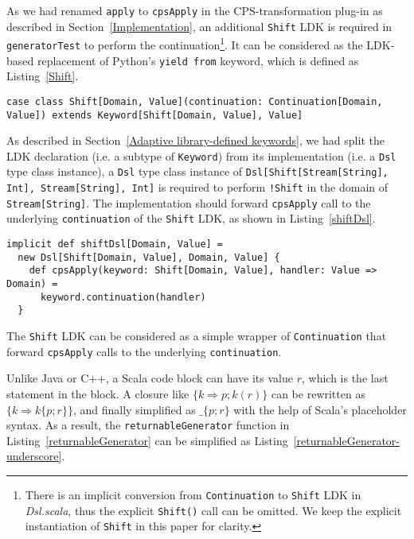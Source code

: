 As we had renamed \lstinline{apply} to \lstinline{cpsApply} in the CPS-transformation plug-in as described in Section~\ref{Implementation},  an additional \lstinline{Shift} LDK is required in \lstinline{generatorTest} to perform the continuation\footnote{There is an implicit conversion from \lstinline{Continuation} to \lstinline{Shift} LDK in \textit{Dsl.scala}, thus the explicit \lstinline{Shift()} call can be omitted. We keep the explicit instantiation of \lstinline{Shift} in this paper for clarity.}. It can be considered as the LDK-based replacement of Python's \lstinline{yield from} keyword, which is defined as Listing~\ref{Shift}.

\begin{lstlisting}[caption={The definition of \lstinline{Shift} LDK},label={Shift}]
case class Shift[Domain, Value](continuation: Continuation[Domain, Value]) extends Keyword[Shift[Domain, Value], Value]
\end{lstlisting}

As described in Section~\ref{Adaptive library-defined keywords}, we had split the LDK declaration (i.e. a subtype of \lstinline{Keyword}) from its implementation (i.e. a \lstinline{Dsl} type class instance), a \lstinline{Dsl} type class instance of \lstinline{Dsl[Shift[Stream[String], Int], Stream[String], Int]} is required to perform \lstinline{!Shift} in the domain of \lstinline{Stream[String]}. The implementation should forward \lstinline{cpsApply} call to the underlying \lstinline{continuation} of the \lstinline{Shift} LDK, as shown in Listing~\ref{shiftDsl}.

\begin{lstlisting}[caption={The \lstinline{Dsl} instance of \lstinline{Shift} LDK, to forward \lstinline{cpsApply} to underlying \lstinline{continuation}},label={shiftDsl}]
implicit def shiftDsl[Domain, Value] =
  new Dsl[Shift[Domain, Value], Domain, Value] {
    def cpsApply(keyword: Shift[Domain, Value], handler: Value => Domain) =
      keyword.continuation(handler)
  }
\end{lstlisting}

The \lstinline{Shift} LDK can be considered as a simple wrapper of \lstinline{Continuation} that forward \lstinline{cpsApply} calls to the underlying \lstinline{continuation}.

Unlike Java or C++, a Scala code block can have its value $r$, which is the last statement in the block. A closure like $\{ k \Rightarrow p; k(r) \}$ can be rewritten as $\{ k \Rightarrow k \{ p; r \} \}$, and finally simplified as $\_ \{ p; r \}$ with the help of Scala's placeholder syntax. As a result, the \lstinline{returnableGenerator} function in Listing~\ref{returnableGenerator} can be simplified as Listing~\ref{returnableGenerator-underscore}.

